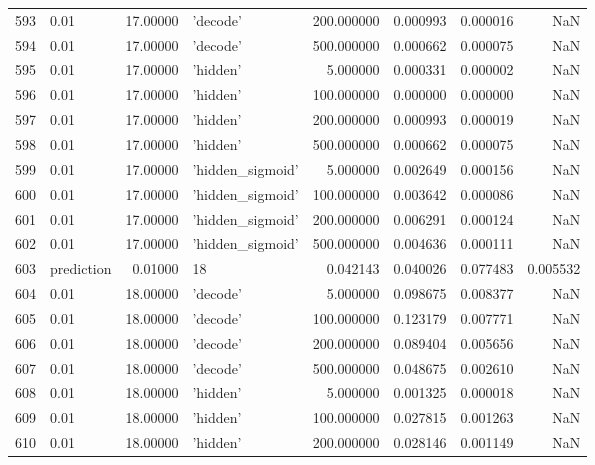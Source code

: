 \documentclass[10pt,a4paper]{article}
\begin{document}
\begin{tabular}{llrlrrrr}
593  &        0.01 &  17.00000 &           'decode' &  200.000000 &  0.000993 &  0.000016 &       NaN \\
594  &        0.01 &  17.00000 &           'decode' &  500.000000 &  0.000662 &  0.000075 &       NaN \\
595  &        0.01 &  17.00000 &           'hidden' &    5.000000 &  0.000331 &  0.000002 &       NaN \\
596  &        0.01 &  17.00000 &           'hidden' &  100.000000 &  0.000000 &  0.000000 &       NaN \\
597  &        0.01 &  17.00000 &           'hidden' &  200.000000 &  0.000993 &  0.000019 &       NaN \\
598  &        0.01 &  17.00000 &           'hidden' &  500.000000 &  0.000662 &  0.000075 &       NaN \\
599  &        0.01 &  17.00000 &   'hidden\_sigmoid' &    5.000000 &  0.002649 &  0.000156 &       NaN \\
600  &        0.01 &  17.00000 &   'hidden\_sigmoid' &  100.000000 &  0.003642 &  0.000086 &       NaN \\
601  &        0.01 &  17.00000 &   'hidden\_sigmoid' &  200.000000 &  0.006291 &  0.000124 &       NaN \\
602  &        0.01 &  17.00000 &   'hidden\_sigmoid' &  500.000000 &  0.004636 &  0.000111 &       NaN \\
603  &  prediction &   0.01000 &                 18 &    0.042143 &  0.040026 &  0.077483 &  0.005532 \\
604  &        0.01 &  18.00000 &           'decode' &    5.000000 &  0.098675 &  0.008377 &       NaN \\
605  &        0.01 &  18.00000 &           'decode' &  100.000000 &  0.123179 &  0.007771 &       NaN \\
606  &        0.01 &  18.00000 &           'decode' &  200.000000 &  0.089404 &  0.005656 &       NaN \\
607  &        0.01 &  18.00000 &           'decode' &  500.000000 &  0.048675 &  0.002610 &       NaN \\
608  &        0.01 &  18.00000 &           'hidden' &    5.000000 &  0.001325 &  0.000018 &       NaN \\
609  &        0.01 &  18.00000 &           'hidden' &  100.000000 &  0.027815 &  0.001263 &       NaN \\
610  &        0.01 &  18.00000 &           'hidden' &  200.000000 &  0.028146 &  0.001149 &       NaN \\

\end{tabular}
\end{document}
